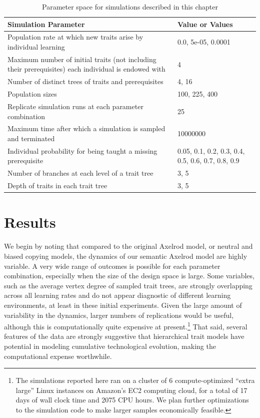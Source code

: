 \begin{table}[H]
\begin{tabular}{|p{}|p{}|}
\hline
\textbf{Simulation Parameter} & \textbf{Value or Values} \\ 
\hline
Population rate at which new traits arise by individual learning & 0.0, 5e-05, 0.0001\\ 
 \hline 
Maximum number of initial traits (not including their prerequisites) each individual is endowed with & 4\\ 
 \hline 
Number of distinct trees of traits and prerequisites & 4, 16\\ 
 \hline 
Population sizes & 100, 225, 400\\ 
 \hline 
Replicate simulation runs at each parameter combination & 25\\ 
 \hline 
Maximum time after which a simulation is sampled and terminated & 10000000\\ 
 \hline 
Individual probability for being taught a missing prerequisite & 0.05, 0.1, 0.2, 0.3, 0.4, 0.5, 0.6, 0.7, 0.8, 0.9\\ 
 \hline 
Number of branches at each level of a trait tree & 3, 5\\ 
 \hline 
Depth of traits in each trait tree & 3, 5\\ 
 \hline 
\hline
\end{tabular}
\caption{Parameter space for simulations described in this chapter}
\label{semax:tab:axelrodct-sim-parameters}
\end{table}

\section{Results}\label{results}

We begin by noting that compared to the original Axelrod model, or
neutral and biased copying models, the dynamics of our semantic Axelrod
model are highly variable. A very wide range of outcomes is possible for
each parameter combination, especially when the size of the design space
is large. Some variables, such as the average vertex degree of sampled
trait trees, are strongly overlapping across all learning rates and do
not appear diagnostic of different learning environments, at least in
these initial experiments. Given the large amount of variability in the
dynamics, larger numbers of replications would be useful, although this
is computationally quite expensive at present.\footnote{The simulations
  reported here ran on a cluster of 6 compute-optimized ``extra large''
  Linux instances on Amazon's EC2 computing cloud, for a total of 17
  days of wall clock time and 2075 CPU hours. We plan further
  optimizations to the simulation code to make larger samples
  economically feasible.} That said, several features of the data are
strongly suggestive that hierarchical trait models have potential in
modeling cumulative technological evolution, making the computational
expense worthwhile.

